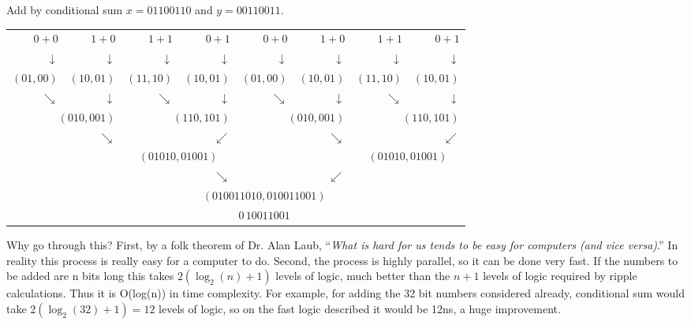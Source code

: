 \begin{example}
Add by conditional sum $x=01100110$ and $y=00110011$.

{\color{ans}
\noindent
\begin{tabular}{rrrrrrrr}
$0+0$ & $1+0$ & $1+1$ & $0+1$ & $0+0$ & $1+0$ & $1+1$ & $0+1$ \\
$\downarrow$ & $\downarrow$ & $\downarrow$ & $\downarrow$ & $\downarrow$ & $\downarrow$ & $\downarrow$ & $\downarrow$ \\
$(01,00)$ & $(10,01)$ & $(11,10)$ & $(10,01)$ & $(01,00)$ & $(10,01)$ & $(11,10)$ & $(10,01)$ \\
$\searrow$ & $\downarrow$ & $\searrow$ & $\downarrow$ & $\searrow$ & $\downarrow$ & $\searrow$ & $\downarrow$ \\
\multicolumn{2}{r}{$(010,001)$} & \multicolumn{2}{r}{$(110,101)$} & \multicolumn{2}{r}{$(010,001)$} & \multicolumn{2}{r}{$(110,101)$} \\
& $\searrow$ & & $\swarrow$ & & $\searrow$ & & $\swarrow$  \\
&  & \multicolumn{2}{c}{$(01010,01001)$} &  &  & \multicolumn{2}{c}{$(01010,01001)$ }  \\
&  &  & $\searrow$ &  & $\swarrow$ &  &  \\
&  &  & \multicolumn{3}{c}{$(010011010,010011001)$} &  &  \\
&  &  & \multicolumn{3}{c}{$0 \, 10011001$} &  &  \\
\end{tabular}
}
\end{example}

Why go through this?  First, by a folk theorem of Dr. Alan Laub, ``\emph{What is hard for us tends to be easy for computers (and vice versa)}.''  In reality this process is really easy for a computer to do.  Second, the process is highly parallel, so it can be done very fast.  If the numbers to be added are n bits long this takes $2(\log_2(n)+1)$ levels of logic, much better than the $n+1$ levels of logic required by ripple calculations.  Thus it is O(log(n)) in time complexity.  For example, for adding the 32 bit numbers considered already, conditional sum would take $2(\log_2(32)+1)=12$ levels of logic, so on the fast logic described it would be 12ns, a huge improvement.

